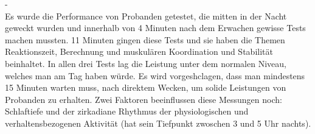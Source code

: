-\cite{wilkinson1971performance}\\
Es wurde die Performance von Probanden getestet, die mitten in der Nacht geweckt wurden und innerhalb von 4 Minuten nach dem Erwachen gewisse Tests machen mussten. 11 Minuten gingen diese Tests und sie haben die Themen Reaktionszeit, Berechnung und muskulären Koordination und Stabilität beinhaltet. In allen drei Tests lag die Leistung unter dem normalen Niveau, welches man am Tag haben würde. Es wird vorgeshclagen, dass man mindestens 15 Minuten warten muss, nach direktem Wecken, um solide Leistungen von Probanden zu erhalten. Zwei Faktoren beeinflussen diese Messungen noch: Schlaftiefe und der zirkadiane Rhythmus der physiologischen und verhaltensbezogenen Aktivität (hat sein Tiefpunkt zwoschen 3 und 5 Uhr nachts).
